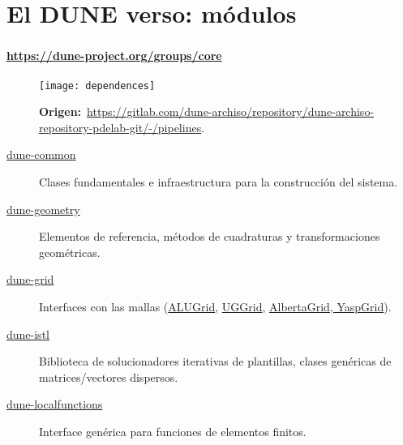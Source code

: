 \section{El DUNE verso: módulos}

\begin{frame}[fragile]
	\frametitle{\secname}
	\framesubtitle{\url{https://dune-project.org/groups/core}}

	\begin{figure}[ht!]
		\centering
		\texttt{[image: dependences]}
		\caption*{
			\textbf{Origen:}~\url{https://gitlab.com/dune-archiso/repository/dune-archiso-repository-pdelab-git/-/pipelines}.
		}
	\end{figure}

	\begin{description}
		\item[\href{https://dune-project.org/modules/dune-common}{dune-common}]

			Clases fundamentales e infraestructura para la construcción del
			sistema.

		\item[\href{https://dune-project.org/modules/dune-geometry}{dune-geometry}]

			Elementos de referencia, métodos de cuadraturas y
			transformaciones geométricas.

		\item[\href{https://dune-project.org/modules/dune-grid}{dune-grid}]

			Interfaces con las mallas
			(\href{https://dune-project.org/modules/dune-alugrid}{ALUGrid},
			\href{https://dune-project.org/modules/dune-uggrid}{UGGrid},
			\href{https://dune-project.org/modules/dune-grid}{AlbertaGrid, YaspGrid}).

		\item[\href{https://dune-project.org/modules/dune-istl}{dune-istl}]

			Biblioteca de solucionadores iterativas de plantillas, clases
			genéricas de matrices/vectores dispersos.

		\item[\href{https://dune-project.org/modules/dune-localfunctions}{dune-localfunctions}]

			Interface genérica para funciones de elementos finitos.
	\end{description}

\end{frame}
